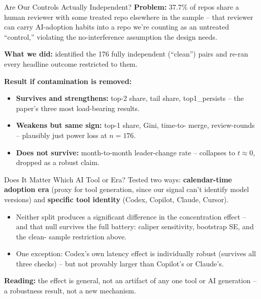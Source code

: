 \begin{frame}{Are Our Controls Actually Independent?}
\textbf{Problem:} 37.7\% of repos share a human reviewer with some
treated repo elsewhere in the sample -- that reviewer can carry
AI-adoption habits into a repo we're counting as an untreated
``control,'' violating the no-interference assumption the design needs.
\vspace{0.3em}

\textbf{What we did:} identified the 176 fully independent (``clean'')
pairs and re-ran every headline outcome restricted to them.
\vspace{0.3em}

\textbf{Result if contamination is removed:}
\begin{itemize}
  \item \textbf{Survives and strengthens:} top-2 share, tail share,
        top1\_persists -- the paper's three most load-bearing results.
  \item \textbf{Weakens but same sign:} top-1 share, Gini, time-to-
        merge, review-rounds -- plausibly just power loss at $n{=}176$.
  \item \textbf{Does not survive:} month-to-month leader-change rate --
        collapses to $t{\approx}0$, dropped as a robust claim.
\end{itemize}
\end{frame}

\begin{frame}{Does It Matter Which AI Tool or Era?}
Tested two ways: \textbf{calendar-time adoption era} (proxy for tool
generation, since our signal can't identify model versions) and
\textbf{specific tool identity} (Codex, Copilot, Claude, Cursor).
\vspace{0.3em}
\begin{itemize}
  \item Neither split produces a significant difference in the
        concentration effect -- and that null survives the full
        battery: caliper sensitivity, bootstrap SE, and the clean-
        sample restriction above.
  \item One exception: Codex's own latency effect is individually
        robust (survives all three checks) -- but not provably larger
        than Copilot's or Claude's.
\end{itemize}
\vspace{0.3em}
\textbf{Reading:} the effect is general, not an artifact of any one
tool or AI generation -- a robustness result, not a new mechanism.
\end{frame}

